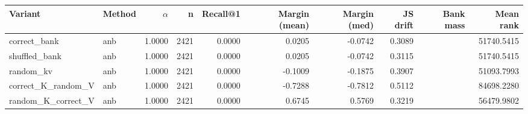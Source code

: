 \begin{tabular}{l l r r r r r r r r}
\toprule
Variant & Method & $\alpha$ & n & Recall@1 & Margin (mean) & Margin (med) & JS drift & Bank mass & Mean rank \\
\midrule
correct\_bank & anb & 1.0000 & 2421 & 0.0000 & 0.0205 & -0.0742 & 0.3089 &  & 51740.5415 \\
shuffled\_bank & anb & 1.0000 & 2421 & 0.0000 & 0.0205 & -0.0742 & 0.3115 &  & 51740.5415 \\
random\_kv & anb & 1.0000 & 2421 & 0.0000 & -0.1009 & -0.1875 & 0.3907 &  & 51093.7993 \\
correct\_K\_random\_V & anb & 1.0000 & 2421 & 0.0000 & -0.7288 & -0.7812 & 0.5112 &  & 84698.2280 \\
random\_K\_correct\_V & anb & 1.0000 & 2421 & 0.0000 & 0.6745 & 0.5769 & 0.3219 &  & 56479.9802 \\
\bottomrule
\end{tabular}

